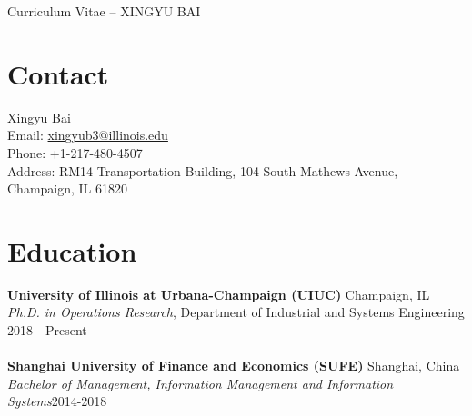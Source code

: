 \documentclass[margin,line]{resume}
\begin{document}
{\sc \Large Curriculum Vitae -- XINGYU BAI}
\begin{resume}

\pagestyle{plain}
\setcounter{page}{1}



    \section{\mysidestyle Contact}
    Xingyu Bai\\
    Email: \href{mailto:xingyub3@illinois.edu}{xingyub3@illinois.edu}\\
    Phone: +1-217-480-4507\\
    Address: RM14 Transportation Building, 104 South Mathews Avenue, Champaign, IL 61820
    
 	  \section{\mysidestyle Education} 
         \textbf{University of Illinois at Urbana-Champaign (UIUC)} \hfill Champaign, IL\\
         {\sl Ph.D. in Operations Research}, Department of Industrial and Systems Engineering \hfill 2018 - Present\\[0.3em]
         \\
         \textbf{Shanghai University of Finance and Economics (SUFE)} \hfill Shanghai, China\\
         {\sl Bachelor of Management, Information Management and Information Systems}\hfill 2014-2018\\


\end{resume}
\end{document}
